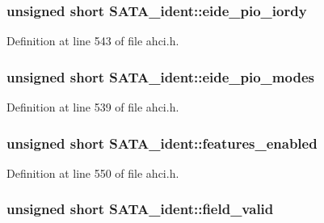 \subsubsection[{\texorpdfstring{eide\+\_\+pio\+\_\+iordy}{eide_pio_iordy}}]{\setlength{\rightskip}{0pt plus 5cm}unsigned short S\+A\+T\+A\+\_\+ident\+::eide\+\_\+pio\+\_\+iordy}\hypertarget{structSATA__ident_a884661c28a77066fb1968a432a48dc80}{}\label{structSATA__ident_a884661c28a77066fb1968a432a48dc80}


Definition at line 543 of file ahci.\+h.

\subsubsection[{\texorpdfstring{eide\+\_\+pio\+\_\+modes}{eide_pio_modes}}]{\setlength{\rightskip}{0pt plus 5cm}unsigned short S\+A\+T\+A\+\_\+ident\+::eide\+\_\+pio\+\_\+modes}\hypertarget{structSATA__ident_ae833370217f85d6eaafd82f290cfebd4}{}\label{structSATA__ident_ae833370217f85d6eaafd82f290cfebd4}


Definition at line 539 of file ahci.\+h.

\subsubsection[{\texorpdfstring{features\+\_\+enabled}{features_enabled}}]{\setlength{\rightskip}{0pt plus 5cm}unsigned short S\+A\+T\+A\+\_\+ident\+::features\+\_\+enabled}\hypertarget{structSATA__ident_aff86049b3b642c906338107dd9a72578}{}\label{structSATA__ident_aff86049b3b642c906338107dd9a72578}


Definition at line 550 of file ahci.\+h.

\subsubsection[{\texorpdfstring{field\+\_\+valid}{field_valid}}]{\setlength{\rightskip}{0pt plus 5cm}unsigned short S\+A\+T\+A\+\_\+ident\+::field\+\_\+valid}\hypertarget{structSATA__ident_a608cd51a438131e344a202ffc559c9b6}{}\label{structSATA__ident_a608cd51a438131e344a202ffc559c9b6}


